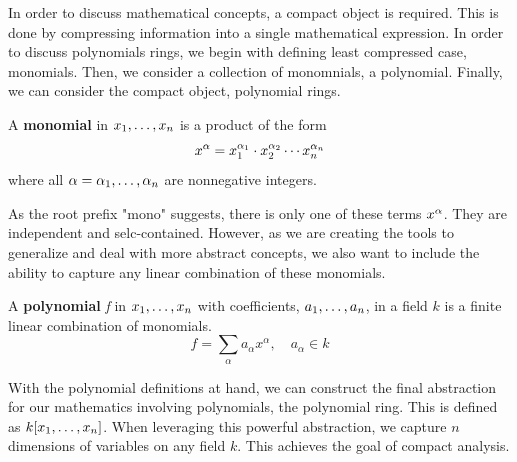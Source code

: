 In order to discuss mathematical concepts, a compact object is required. This is done by compressing information into a single mathematical expression. In order to discuss polynomials rings, we begin with defining least compressed case, monomials. Then, we consider a collection of monomnials, a polynomial. Finally, we can consider the compact object, polynomial rings.

\begin{definition}
A \textbf{monomial} in $x_1, \dots, x_n$ is a product of the form
    \[
        x^\alpha = x_1^{\alpha_1} \cdot x_2^{\alpha_2} \cdots x_n^{\alpha_n}
    \]
where all $ \alpha = \alpha_1, \dots, \alpha_n$ are nonnegative integers.
\end{definition}

As the root prefix "mono" suggests, there is only one of these terms $x^\alpha$. They are independent and selc-contained. However, as we are creating the tools to generalize and deal with more abstract concepts, we also want to include the ability to capture any linear combination of these monomials.

\begin{definition}\label{def:polynomial}
A \textbf{polynomial} \textit{f} in $x_1, \dots, x_n$ with coefficients, $a_1, \dots, a_n$, in a field $k$ is a finite linear combination of monomials. 
    \[
        f = \sum_{\alpha} a_{\alpha} x^\alpha,\quad a_{\alpha} \in k
    \]
\end{definition}

With the polynomial definitions at hand, we can construct the final abstraction for our mathematics involving polynomials, the polynomial ring. This is defined as $k\lbrack x_1, \dots, x_n \rbrack$. When leveraging this powerful abstraction, we capture $n$ dimensions of variables on any field $k$. This achieves the goal of compact analysis.  